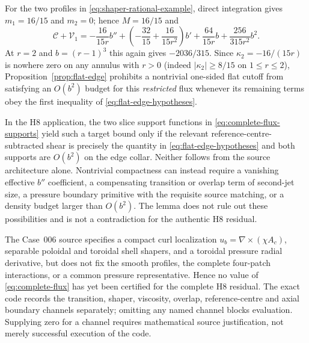\documentclass[11pt,a4paper]{article}
\theoremstyle{plain}
\theoremstyle{definition}
\begin{document}
For the two profiles in \eqref{eq:shaper-rational-example}, direct
integration gives $m_1=16/15$ and $m_2=0$; hence $M=16/15$ and
\begin{equation}\label{eq:flat-edge-explicit}
 \mathcal C+\mathcal V_1
 =-\frac{16}{15r}b''
 +\left(-\frac{32}{15}+\frac{16}{15r^2}\right)b'
 +\frac{64}{15r}b+\frac{256}{315r^2}b^2.
\end{equation}
At $r=2$ and $b=(r-1)^3$ this again gives
$-2036/315$. Since $\kappa_2=-16/(15r)$ is nowhere zero on
any annulus with $r>0$ (indeed $|\kappa_2|\ge8/15$ on
$1\le r\le2$), Proposition~\ref{prop:flat-edge}
prohibits a nontrivial one-sided flat cutoff from satisfying an
$O(b^2)$ budget for this \emph{restricted} flux whenever its remaining
terms obey the first inequality of \eqref{eq:flat-edge-hypotheses}.

In the H8 application, the two slice support functions in
\eqref{eq:complete-flux-supports} yield such a target bound only if
the relevant reference-centre-subtracted shear is precisely the
quantity in \eqref{eq:flat-edge-hypotheses} and both supports are
$O(b^2)$ on the edge collar. Neither follows from the source
architecture alone. Nontrivial compactness can instead require a
vanishing effective $b''$ coefficient, a compensating transition or
overlap term of second-jet size, a pressure boundary primitive with
the requisite source matching, or a density budget larger than
$O(b^2)$. The lemma does not rule out these possibilities and is not
a contradiction for the authentic H8 residual.

The Case~006 source specifies a compact curl localization
$u_b=\nabla\times(\chi A_c)$, separable poloidal and toroidal
shell shapers, and a toroidal pressure radial derivative, but does
not fix the smooth profiles, the complete four-patch interactions,
or a common pressure representative. Hence no value of
\eqref{eq:complete-flux} has yet been certified for the complete H8
residual. The exact code records the transition, shaper, viscosity,
overlap, reference-centre and axial boundary channels separately;
omitting any named channel blocks evaluation. Supplying zero for a
channel requires mathematical source justification, not merely
successful execution of the code.
\end{document}

